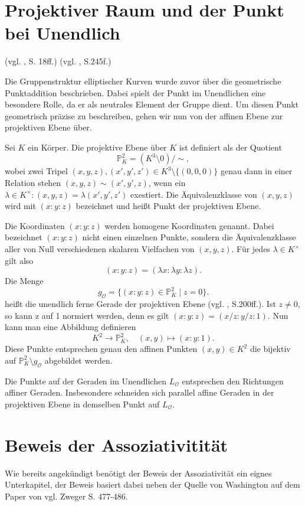 \section{Projektiver Raum und der Punkt bei Unendlich} (vgl. \cite{washington08}, S. 18ff.)
(vgl. \cite{clader25}, S.245f.)

Die Gruppenstruktur elliptischer Kurven wurde zuvor über die geometrische
Punktaddition beschrieben. Dabei spielt der Punkt im Unendlichen eine besondere
Rolle, da er als neutrales Element der Gruppe dient. Um diesen Punkt geometrisch
präzise zu beschreiben, gehen wir nun von der affinen Ebene zur projektiven Ebene über.

\begin{definition}
    Sei \(K\) ein Körper. Die projektive Ebene über \(K\) ist definiert als der Quotient
    \[
        \mathbb P^2_K
        =
        \left(K^3\setminus0\right)/\sim,
    \]
    wobei zwei Tripel \((x,y,z),(x',y',z')\in K^3\setminus\{(0,0,0)\}\) genau dann in einer Relation  stehen \(
    (x,y,z)\sim (x',y',z)\), wenn ein \(\lambda\in K^\times:
    (x,y,z)=\lambda(x',y',z')\) exestiert.
    Die Äquivalenzklasse von \((x,y,z)\) wird mit
    \((x:y:z)\) bezeichnet und heißt Punkt der projektiven Ebene.
\end{definition}
Die Koordinaten \((x:y:z)\) werden homogene Koordinaten genannt. Dabei bezeichnet \((x:y:z)\) nicht einen einzelnen Punkte, sondern die Äquivalenzklasse aller von Null verschiedenen skalaren Vielfachen von \((x,y,z)\). Für jedes \(\lambda\in K^\times\) gilt also
\[
    (x:y:z)=(\lambda x:\lambda y:\lambda z).
\]
Die Menge
\[
    g_\mathcal{O}=\{(x:y:z)\in \mathbb P^2_K\mid z=0\}.
\]
heißt die unendlich ferne Gerade der projektiven Ebene (vgl. \cite{forster15}, S.200ff.).
Ist $z \neq 0$, so kann z auf 1 normiert werden, denn es gilt \((x:y:z)=(x/z:y/z:1)\). Nun kann man eine Abbildung definieren
\[
    K^2\longrightarrow\mathbb{P}^2_K, \quad
    (x,y)\mapsto (x:y:1).
\]
Diese Punkte entsprechen genau den affinen Punkten \((x,y)\in K^2\) die bijektiv auf \(\mathbb{P}^2_K\setminus g_\mathcal{O}\) abgebildet werden.


\begin{lemma}
    Die Punkte auf der Geraden im Unendlichen \(L_\mathcal{O}\) entsprechen den Richtungen affiner Geraden. Insbesondere schneiden sich parallel affine Geraden in der projektiven Ebene in demselben Punkt auf \(L_\mathcal{O}\).
\end{lemma}

\section{Beweis der Assoziativitität}
\label{sec:assoziativitaet}
Wie bereits angekündigt benötigt der Beweis der Assoziativität ein eignes Unterkapitel, der Beweis basiert dabei neben der Quelle von Washington auf dem Paper von \cite{zwegers24} vgl. Zweger S. 477-486.


